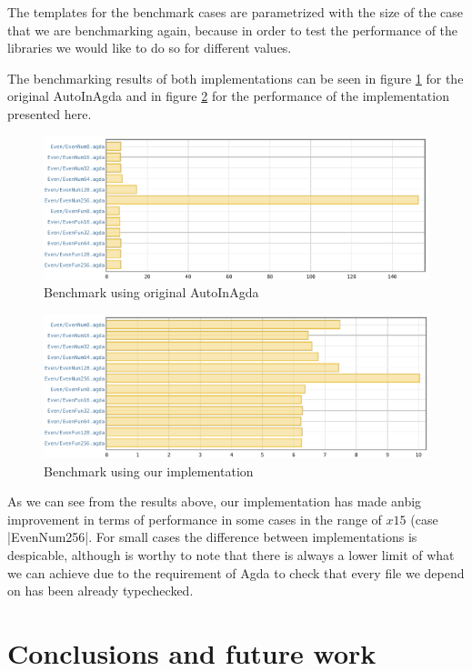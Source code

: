\documentclass[a4paper]{article}
\begin{document}
The templates for the benchmark cases are parametrized with the size of the case
that we are benchmarking again, because in order to test the performance of the 
libraries we would like to do so for different values.

The benchmarking results of both implementations can be seen in figure
\ref{fig:vanilla} for the original AutoInAgda and in figure \ref{fig:our} for
the performance of the implementation presented here.

\begin{figure}[h]
  \includegraphics[scale=0.6]{benchmark-vanilla}
  \caption{Benchmark using original AutoInAgda}
  \label{fig:vanilla}
\end{figure}

\begin{figure}[h]
  \includegraphics[scale=0.6]{benchmark}
  \caption{Benchmark using our implementation}
  \label{fig:our}
\end{figure}

As we can see from the results above, our implementation has made anbig
improvement in terms of performance in some cases in the range of $x15$ (case
|EvenNum256|. For small cases the difference between implementations is
despicable, although is worthy to note that there is always a lower limit of
what we can achieve due to the requirement of Agda to check that every file we
depend on has been already typechecked.

\section{Conclusions and future work}
\label{sec:conclusions}
\end{document}
